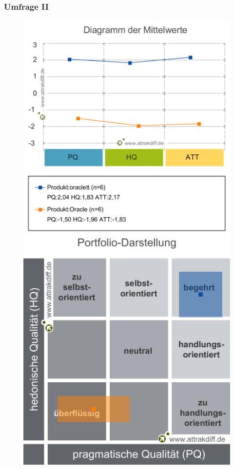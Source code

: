 \documentclass{beamer}
\begin{document}
\begin{frame}
  \frametitle{Umfrage II}

\begin{figure}
  \centering
  \begin{minipage}[b]{0.4\textwidth}
    \centering
    \includegraphics[scale=0.19]{attrak-mittelwerte.png}
  \end{minipage}
  \hfill
  \begin{minipage}[b]{0.4\textwidth}
    \centering
    \includegraphics[scale=0.18]{attrak-portfolio.png}
  \end{minipage}
\end{figure}
\end{frame}
\end{document}
